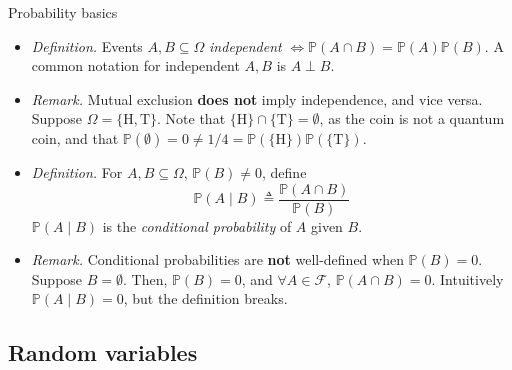 \documentclass{beamer}
\numberwithin{equation}{section}
\begin{document}
\begin{frame}{Probability basics}
    \begin{itemize}
        \item
        \textit{Definition.} Events $ A, B \subseteq \Omega $
        \textit{independent} $ \Leftrightarrow \mathbb{P}(A \cap B) =
        \mathbb{P}(A)\mathbb{P}(B) $. A common notation for independent
        $ A, B $ is $ A \perp B $.

        \item
        \textit{Remark.} Mutual exclusion \textbf{does not} imply independence,
        and vice versa. Suppose $ \Omega = \{\text{H}, \text{T}\} $. Note that
        $ \{\text{H}\} \cap \{\text{T}\} = \emptyset $, as the coin is not a
        quantum coin, and that $ \mathbb{P}(\emptyset) = 0 \ne 1 / 4 =
        \mathbb{P}(\{\text{H}\})\mathbb{P}(\{\text{T}\}) $.

        \item
        \textit{Definition.} For $ A, B \subseteq \Omega $,
        $ \mathbb{P}(B) \ne 0 $, define
        \begin{equation*}
            \mathbb{P}(A \mid B) \triangleq \frac{\mathbb{P}(A \cap B)}{
                \mathbb{P}(B)            
            }
        \end{equation*}
        $ \mathbb{P}(A \mid B) $ is the \textit{conditional probability} of
        $ A $ given $ B $.

        \item
        \textit{Remark.} Conditional probabilities are \textbf{not}
        well-defined when $ \mathbb{P}(B) = 0 $. Suppose $ B = \emptyset $.
        Then, $ \mathbb{P}(B) = 0 $, and $ \forall A \in \mathcal{F} $,
        $ \mathbb{P}(A \cap B) = 0 $. Intuitively
        $ \mathbb{P}(A \mid B) = 0 $, but the definition breaks.
    \end{itemize}
\end{frame}

\subsection{Random variables}
\end{document}

